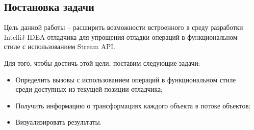 \subsection{Постановка задачи}
Цель данной работы -- расширить возможности встроенного в среду разработки IntelliJ IDEA отладчика для упрощения отладки операций в функциональном стиле с использованием Stream API.

Для того, чтобы достичь этой цели, поставим следующие задачи:
\begin{itemize}
	\item Определить вызовы с использованием операций в функциональном стиле среди доступных из текущей позиции отладчика;
	\item Получить информацию о трансформациях каждого объекта в потоке объектов;
	\item Визуализировать результаты.
\end{itemize}
